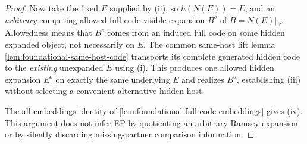 \begin{proof}
Now take the fixed $E$ supplied by
(ii), so $h(N(E))=E$, and an
\emph{arbitrary} competing allowed
full-code visible expansion $B^o$ of
$B=N(E)|_{\mathcal V}$. Allowedness means
that $B^o$ comes from an induced full
code on some hidden expanded object,
not necessarily on $E$.
The common same-host lift lemma
\cref{lem:foundational-same-host-code}
transports its complete generated
hidden code to the \emph{existing}
unexpanded $E$ using (i). This
produces one allowed hidden expansion
$E^o$ on exactly the same underlying
$E$ and realizes $B^o$, establishing
(iii) without selecting a convenient
alternative hidden host.

The all-embeddings identity of
\cref{lem:foundational-full-code-embeddings}
gives (iv). This argument does not
infer EP by quotienting an arbitrary
Ramsey expansion or by silently
discarding missing-partner
comparison information.
\end{proof}


